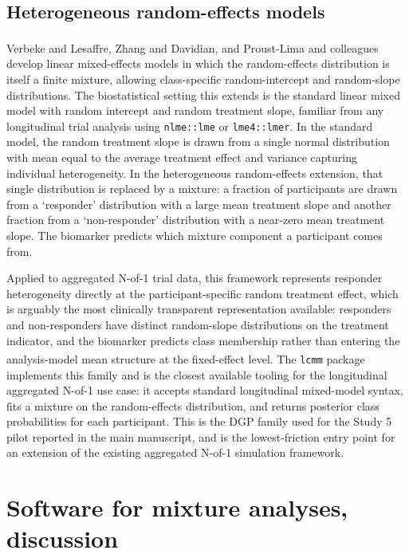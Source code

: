 \documentclass[
  11pt,
]{article}
\begin{document}
\subsection{Heterogeneous random-effects models}\label{heterogeneous-random-effects-models}

Verbeke and Lesaffre\textsuperscript{}, Zhang and Davidian\textsuperscript{}, and Proust-Lima and colleagues\textsuperscript{}
develop linear mixed-effects models in which the random-effects
distribution is itself a finite mixture, allowing class-specific
random-intercept and random-slope distributions. The biostatistical
setting this extends is the standard linear mixed model with random
intercept and random treatment slope, familiar from any longitudinal
trial analysis using \texttt{nlme::lme} or \texttt{lme4::lmer}. In the
standard model, the random treatment slope is drawn from a single
normal distribution with mean equal to the average treatment effect
and variance capturing individual heterogeneity. In the heterogeneous
random-effects extension, that single distribution is replaced by a
mixture: a fraction of participants are drawn from a `responder'
distribution with a large mean treatment slope and another fraction
from a `non-responder' distribution with a near-zero mean treatment
slope. The biomarker predicts which mixture component a participant
comes from.

Applied to aggregated N-of-1 trial data, this framework represents
responder heterogeneity directly at the participant-specific random
treatment effect, which is arguably the most clinically transparent
representation available: responders and non-responders have distinct
random-slope distributions on the treatment indicator, and the
biomarker predicts class membership rather than entering the
analysis-model mean structure at the fixed-effect level. The
\texttt{lcmm} package\textsuperscript{} implements this family and is
the closest available tooling for the longitudinal aggregated N-of-1
use case: it accepts standard longitudinal mixed-model syntax, fits a
mixture on the random-effects distribution, and returns posterior class
probabilities for each participant. This is the DGP family used for
the Study 5 pilot reported in the main manuscript, and is the
lowest-friction entry point for an extension of the existing
aggregated N-of-1 simulation framework.

\section{Software for mixture analyses, discussion}\label{software-for-mixture-analyses-discussion}
\end{document}
